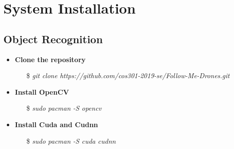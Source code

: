 \chapter{System Installation}
\section{Object Recognition}
\begin{itemize}
    \item \textbf{Clone the repository}
        \begin{itemize}
            \item[\$] \textit{git clone https://github.com/cos301-2019-se/Follow-Me-Drones.git}
        \end{itemize}
    \item \textbf{Install OpenCV}
        \begin{itemize}
            \item[\$] \textit{sudo pacman -S opencv}
        \end{itemize}
    \item \textbf{Install Cuda and Cudnn}
        \begin{itemize}
            \item[\$] \textit{sudo pacman -S cuda cudnn}
        \end{itemize}
\end{itemize}